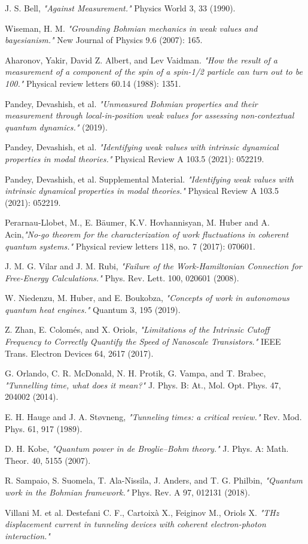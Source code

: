 \documentclass[11pt, a4paper]{article} %
\begin{document}
\begin{thebibliography}{1}
{
J. S. Bell, {\em "Against Measurement."} Physics World 3, 33 (1990).

Wiseman, H. M. {\em "Grounding Bohmian mechanics in weak values and bayesianism."} New Journal of Physics 9.6 (2007): 165.

Aharonov, Yakir, David Z. Albert, and Lev Vaidman. {\em "How the result of a measurement of a component of the spin of a spin-1/2 particle can turn out to be 100."} Physical review letters 60.14 (1988): 1351.

Pandey, Devashish, et al. {\em "Unmeasured Bohmian properties and their measurement through local-in-position weak values for assessing non-contextual quantum dynamics."} (2019).

Pandey, Devashish, et al. {\em "Identifying weak values with intrinsic dynamical properties in modal theories."} Physical Review A 103.5 (2021): 052219.

Pandey, Devashish, et al. Supplemental Material. {\em "Identifying weak values with intrinsic dynamical properties in modal theories."} Physical Review A 103.5 (2021): 052219.

Perarnau-Llobet, M., E. Bäumer, K.V. Hovhannisyan, M. Huber and A. Acin,{\em "No-go theorem for the characterization of work fluctuations in coherent quantum systems."} Physical review letters 118, no. 7 (2017): 070601.

J. M. G. Vilar and J. M. Rubi, {\em "Failure of the Work-Hamiltonian Connection for Free-Energy Calculations." }Phys. Rev. Lett. 100, 020601 (2008).

W. Niedenzu, M. Huber, and E. Boukobza, {\em "Concepts of work in autonomous quantum heat engines."} Quantum 3, 195 (2019).

Z. Zhan, E. Colomés, and X. Oriols, {\em  "Limitations of the Intrinsic Cutoff Frequency to Correctly Quantify the Speed of Nanoscale Transistors."} IEEE Trans. Electron Devices 64, 2617 (2017).

G. Orlando, C. R. McDonald, N. H. Protik, G. Vampa, and T. Brabec, {\em "Tunnelling time, what does it mean?"} J. Phys. B: At., Mol. Opt. Phys. 47, 204002 (2014).

E. H. Hauge and J. A. Støvneng, {\em "Tunneling times: a critical review."} Rev. Mod. Phys. 61, 917 (1989).

D. H. Kobe, {\em "Quantum power in de Broglie–Bohm theory."} J. Phys. A: Math. Theor. 40, 5155 (2007).

R. Sampaio, S. Suomela, T. Ala-Nissila, J. Anders, and T. G. Philbin, {\em "Quantum work in the Bohmian framework."} Phys. Rev. A 97, 012131 (2018).

Villani M. et al. Destefani C. F., Cartoixà X., Feiginov M., Oriols X. {\em "THz displacement current in tunneling devices with coherent electron-photon
interaction."}

}

\end{thebibliography}
\end{document}
